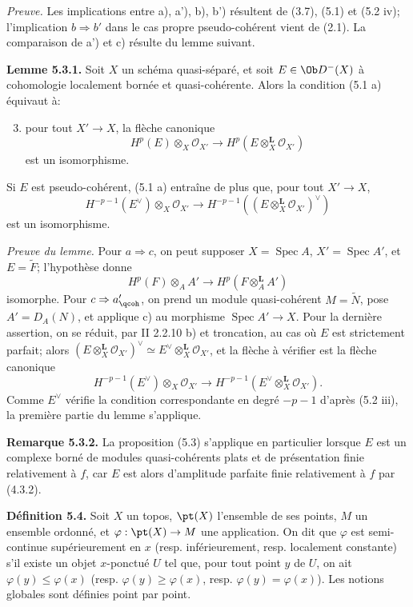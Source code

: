 \documentclass[11pt]{article}
\newcommand{\Spec}{\operatorname{Spec}}
\begin{document}
\emph{Preuve.} Les implications entre a), a'), b), b') résultent de (3.7), (5.1) et (5.2 iv); l'implication \(b\Rightarrow b'\) dans le cas propre pseudo-cohérent vient de (2.1). La comparaison de a') et c) résulte du lemme suivant.

\textbf{Lemme 5.3.1.} Soit \(X\) un schéma quasi-séparé, et soit \(E\in\Ob D^{-}(X)\) à cohomologie localement bornée et quasi-cohérente. Alors la condition (5.1 a) équivaut à:
\begin{enumerate}[label=\alph*)]
\setcounter{enumi}{2}
\item pour tout \(X'\to X\), la flèche canonique
\[
 H^p(E)\otimes_X\mathcal O_{X'}
 \longrightarrow
 H^p(E\otimes_X^{\mathbf L}\mathcal O_{X'})
\]
est un isomorphisme.
\end{enumerate}
Si \(E\) est pseudo-cohérent, (5.1 a) entraîne de plus que, pour tout \(X'\to X\),
\[
 H^{-p-1}(E^{\vee})\otimes_X\mathcal O_{X'}
 \longrightarrow
 H^{-p-1}((E\otimes_X^{\mathbf L}\mathcal O_{X'})^{\vee})
\tag{5.3.1.1}
\]
est un isomorphisme.

\emph{Preuve du lemme.} Pour \(a\Rightarrow c\), on peut supposer \(X=\Spec A\), \(X'=\Spec A'\), et \(E=\widetilde F\); l'hypothèse donne
\[
 H^p(F)\otimes_AA'
 \longrightarrow
 H^p(F\otimes_A^{\mathbf L}A')
\]
isomorphe. Pour \(c\Rightarrow a'_{\qcoh}\), on prend un module quasi-cohérent \(M=\widetilde N\), pose \(A'=D_A(N)\), et applique c) au morphisme \(\Spec A'\to X\). Pour la dernière assertion, on se réduit, par II 2.2.10 b) et troncation, au cas où \(E\) est strictement parfait; alors \((E\otimes_X^{\mathbf L}\mathcal O_{X'})^{\vee}\simeq E^{\vee}\otimes_X^{\mathbf L}\mathcal O_{X'}\), et la flèche à vérifier est la flèche canonique
\[
 H^{-p-1}(E^{\vee})\otimes_X\mathcal O_{X'}
 \longrightarrow
 H^{-p-1}(E^{\vee}\otimes_X^{\mathbf L}\mathcal O_{X'}).
\]
Comme \(E^{\vee}\) vérifie la condition correspondante en degré \(-p-1\) d'après (5.2 iii), la première partie du lemme s'applique.

\textbf{Remarque 5.3.2.} La proposition (5.3) s'applique en particulier lorsque \(E\) est un complexe borné de modules quasi-cohérents plats et de présentation finie relativement à \(f\), car \(E\) est alors d'amplitude parfaite finie relativement à \(f\) par (4.3.2).

\textbf{Définition 5.4.} Soit \(X\) un topos, \(\pt(X)\) l'ensemble de ses points, \(M\) un ensemble ordonné, et \(\varphi:\pt(X)\to M\) une application. On dit que \(\varphi\) est semi-continue supérieurement en \(x\) (resp. inférieurement, resp. localement constante) s'il existe un objet \(x\)-ponctué \(U\) tel que, pour tout point \(y\) de \(U\), on ait \(\varphi(y)\leq\varphi(x)\) (resp. \(\varphi(y)\geq\varphi(x)\), resp. \(\varphi(y)=\varphi(x)\)). Les notions globales sont définies point par point.
\end{document}
